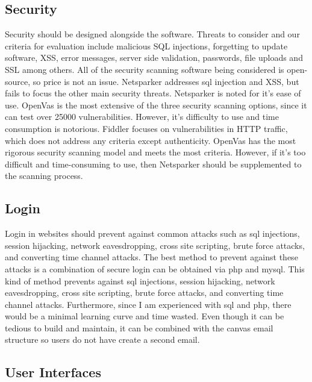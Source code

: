 \documentclass[letterpaper,10pt,titlepage,journal,compsoc,draftclsnofoot,onecolumn]{IEEEtran}
\begin{document}
\subsection{Security}

Security should be designed alongside the software. Threats to consider and our criteria for evaluation include malicious SQL injections, forgetting to update software, XSS, error messages, server side validation, passwords, file uploads and SSL among others. All of the security scanning software being considered is open-source, so price is not an issue. Netsparker addresses sql injection and XSS, but fails to focus the other main security threats. Netsparker is noted for it's ease of use. OpenVas is the most extensive of the three security scanning options, since it can test over 25000 vulnerabilities. However, it's difficulty to use and time consumption is notorious. Fiddler focuses on vulnerabilities in HTTP traffic, which does not address any criteria except authenticity. OpenVas has the most rigorous security scanning model and meets the most criteria. However, if it's too difficult and time-consuming to use, then Netsparker should be supplemented to the scanning process.

\subsection{Login}

Login in websites should prevent against common attacks such as sql injections, session hijacking, network eavesdropping, cross site scripting, brute force attacks,  and converting time channel attacks. The best method to prevent against these attacks is a combination of secure login can be obtained via php and mysql. This kind of method prevents against sql injections, session hijacking, network eavesdropping, cross site scripting, brute force attacks,  and converting time channel attacks. Furthermore, since I am experienced with sql and php, there would be a minimal learning curve and time wasted. Even though it can be tedious to build and maintain, it can be combined with the canvas email structure so users do not have create a second email.

\subsection{User Interfaces}
\end{document}
